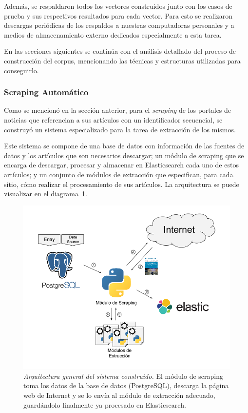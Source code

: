 Además, se respaldaron todos los vectores construidos junto con los casos de prueba y sus respectivos
resultados para cada vector. Para esto se realizaron descargas periódicas de los respaldos a nuestras
computadoras personales y a medios de almacenamiento externo dedicados especialmente a esta
tarea.

En las secciones siguientes se continúa con el análisis detallado del proceso de construcción del corpus,
mencionando las técnicas y estructuras utilizadas para conseguirlo.


\subsubsection{Scraping Automático}

Como se mencionó en la sección anterior, para el \textit{scraping} de los portales de noticias que
referencian a sus artículos con un identificador secuencial, se construyó un sistema especializado
para la tarea de extracción de los mismos.

Este sistema se compone de una base de datos con información de las fuentes de datos y los artículos
que son necesarios descargar; un módulo de scraping que se encarga de descargar, procesar y
almacenar en Elasticsearch cada uno de estos artículos; y un conjunto de módulos de extracción que
especifican, para cada sitio, cómo realizar el procesamiento de sus artículos. La arquitectura se
puede visualizar en el diagrama~\ref{fig:autoscraper-arq}.

\begin{figure}[h]
  \centering
  \includegraphics[width=\textwidth]{images/diag-corpus-autoscraper}
  \caption{\textit{Arquitectura general del sistema construido.} El módulo de scraping toma los datos de la
base de datos (PostgreSQL), descarga la página web de Internet y se lo envía al módulo de extracción
adecuado, guardándolo finalmente ya procesado en Elasticsearch.}
  \label{fig:autoscraper-arq}
\end{figure}

